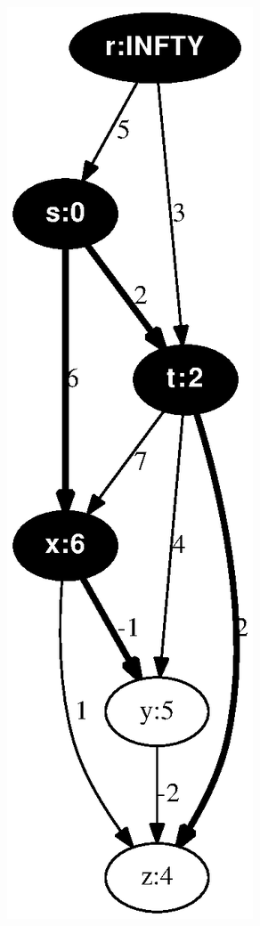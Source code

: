 \documentclass{article}
\begin{document}
\includegraphics[height=.3\textheight]{dag_shortest_path_04.eps}
\vspace{1em}
\end{document}
